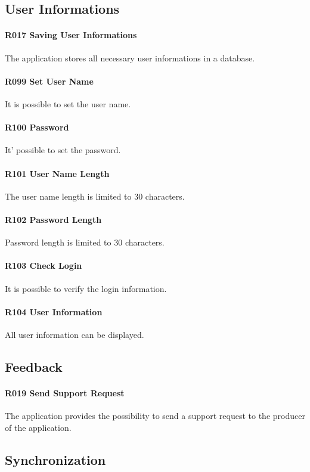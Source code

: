\subsection{User Informations}
\paragraph{R017 Saving User Informations}
The application stores all necessary user informations in a database.
\paragraph{R099 Set User Name}
It is possible to set the user name.
\paragraph{R100 Password}
It' possible to set the password.
\paragraph{R101 User Name Length}
The user name length is limited to 30 characters.
\paragraph{R102 Password Length}
Password length is limited to 30 characters.
\paragraph{R103 Check Login}
It is possible to verify the login information.
\paragraph{R104 User Information}
All user information can be displayed.

\subsection{Feedback}
\paragraph{R019 Send Support Request}
The application provides the possibility to send a support request to the producer of the application.

\subsection{Synchronization}
